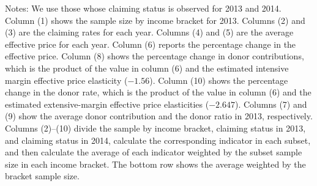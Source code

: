 \begin{table}
\begin{threeparttable}
\begin{tablenotes}
\item Notes: We use those whose claiming status is observed for 2013 and 2014. Column (1) shows the sample size by income bracket for 2013. Columns (2) and (3) are the claiming rates for each year. Columns (4) and (5) are the average effective price for each year. Column (6) reports the percentage change in the effective price. Column (8) shows the percentage change in donor contributions, which is the product of the value in column (6) and the estimated intensive margin effective price elasticity ($-1.56$). Column (10) shows the percentage change in the donor rate, which is the product of the value in column (6) and the estimated extensive-margin effective price elasticities ($-2.647$). Columns (7) and (9) show the average donor contribution and the donor ratio in 2013, respectively. Columns (2)--(10) divide the sample by income bracket, claiming status in 2013, and claiming status in 2014, calculate the corresponding indicator in each subset, and then calculate the average of each indicator weighted by the subset sample size in each income bracket. The bottom row shows the average weighted by the bracket sample size.
\end{tablenotes}
\end{threeparttable}
\end{table}
